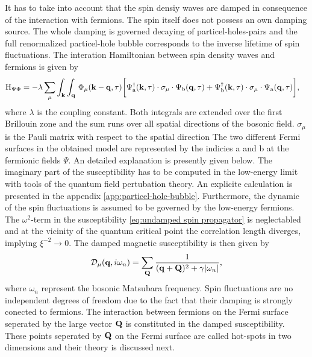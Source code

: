 It has to take into account that the spin densiy waves are damped in consequence of the interaction with fermions.
The spin itself does not possess an own damping source.
The whole damping is governed decaying of particel-holes-pairs and the full renormalized particel-hole bubble corresponds to the inverse lifetime of spin fluctuations.
The interation Hamiltonian between spin density waves and fermions is given by
%
\begin{align}
	\mathrm{H}_{\Psi\Phi} &= 
		-\lambda \sum\limits_{\mu} \int_{\vb{k}} \int_{\vb{q}}\,
		\Phi_{\mu}(\vb{k}-\vb{q}, \tau)
		\bigg[
			\Psi_{\mathrm{a}}^{\dag}(\vb{k},\tau) \cdot \sigma_{\mu} \cdot \Psi_{\mathrm{b}}(\vb{q},\tau)
			+
			\Psi_{\mathrm{b}}^{\dag}(\vb{k},\tau) \cdot \sigma_{\mu} \cdot \Psi_{\mathrm{a}}(\vb{q},\tau)
		\bigg],
	\label{eq:Hamiltonian interaction}
\end{align}
%
where $\lambda$ is the coupling constant. 
Both integrals are extended over the first Brillouin zone and the sum runs over all spatial directions of the bosonic field.
$\sigma_{\mu}$ is the Pauli matrix with respect to the spatial direction
The two different Fermi surfaces in the obtained model are represented by the indicies a and b at the fermionic fields $\Psi$.
An detailed explanation is presently given below.
The imaginary part of the susceptibility has to be computed in the low-energy limit with tools of the quantum field pertubation theory.
An explicite calculation is presented in the appendix \ref{app:particel-hole-bubble}.
Furthermore, the dynamic of the spin fluctuations is assumed to be governed by the low-energy fermions.
The $\omega^{2}$-term in the susceptibility \eqref{eq:undamped spin propagator} is neglectabled \cite{Abanov&Chubukov&Schmalian} and at the vicinity of the quantum critical point the correlation length diverges, implying $\xi^{-2} \to 0$.
The damped magnetic susceptibility is then given by
%
\begin{align}
	\mathcal{D}_{\mu}(\vb{q}, i\omega_{n}) = \sum\limits_{\vb{Q}} \frac{1}{(\vb{q}+\vb{Q})^{2} + \gamma|\omega_{n}|},
	\label{eq:damped spin propagator}
\end{align}
%
where $\omega_{n}$ represent the bosonic Matsubara frequency.
Spin fluctuations are no independent degrees of freedom due to the fact that their damping is strongly conected to fermions.
The interaction between fermions on the Fermi surface seperated by the large vector $\vb{Q}$ is constituted in the damped susceptibility.
These points seperated by $\vb{Q}$ on the Fermi surface are called hot-spots in two dimensions and their theory is discussed next.
